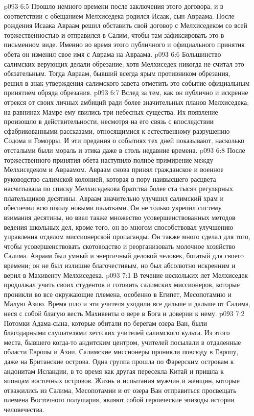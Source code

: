 \vs p093 6:5 Прошло немного времени после заключения этого договора, и в соответствии с обещанием Мелхиседека родился Исаак, сын Авраама. После рождения Исаака Авраам решил обставить свой договор с Мелхиседеком со всей торжественностью и отправился в Салим, чтобы там зафиксировать это в письменном виде. Именно во время этого публичного и официального принятия обета он изменил свое имя с Аврама на Авраама.
\vs p093 6:6 Большинство салимских верующих делали обрезание, хотя Мелхиседек никогда не считал это обязательным. Тогда Авраам, бывший всегда ярым противником обрезания, решил в знак утверждения салимского завета отметить это событие официальным принятием обряда обрезания.
\vs p093 6:7 Вслед за тем, как он публично и искренне отрекся от своих личных амбиций ради более значительных планов Мелхиседека, на равнинах Мамре ему явились три небесных существа. Их появление произошло в действительности, несмотря на его связь с впоследствии сфабрикованными рассказами, относящимися к естественному разрушению Содома и Гоморры. И эти предания о событиях тех дней показывают, насколько отсталыми были мораль и этика даже в столь недавние времена.
\vs p093 6:8 После торжественного принятия обета наступило полное примирение между Мелхиседеком и Авраамом. Авраам снова принял гражданское и военное руководство салимской колонией, которая в пору наивысшего расцвета насчитывала по списку Мелхиседекова братства более ста тысяч регулярных плательщиков десятины. Авраам значительно улучшил салимский храм и обеспечил всю школу новыми палатками. Он не только укрепил систему взимания десятины, но ввел также множество усовершенствованных методов ведения школьных дел, кроме того, он во многом способствовал улучшению управления отделом миссионерской пропаганды. Он также много сделал для того, чтобы усовершенствовать скотоводство и реорганизовать молочное хозяйство Салима. Авраам был умный и энергичный деловой человек, богатый для своего времени; он не был излишне благочестивым, но был абсолютно искренним и верил в Махивенту Мелхиседека.
\vs p093 7:1 В течение нескольких лет Мелхиседек продолжал учить своих студентов и готовить салимских миссионеров, которые проникли во все окружающие племена, особенно в Египет, Месопотамию и Малую Азию. Время шло и эти учителя уходили все дальше и дальше от Салима, неся с собой благую весть Махивенты о вере в Бога и доверии к нему.
\vs p093 7:2 Потомки Адама\hyp{}сына, которые обитали по берегам озера Ван, были благодарными слушателями хеттских учителей салимского культа. Из этого места, бывшего когда\hyp{}то андитским центром, учителей посылали в отдаленные области Европы и Азии. Салимские миссионеры проникли повсюду в Европу, даже на Британские острова. Одна группа прошла по Фарерским островам к андонитам Исландии, в то время как другая пересекла Китай и пришла к японцам восточных островов. Жизнь и испытания мужчин и женщин, которые отважились из Салима, Месопотамии и от озера Ван отправиться просвещать племена Восточного полушария, являют собой героические эпизоды истории человечества.

